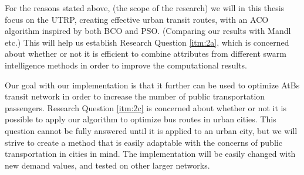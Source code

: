 For the reasons stated above, (the scope of the research) we will in this thesis focus on the UTRP, creating effective urban transit routes, with an ACO algorithm inspired by both BCO and PSO. (Comparing our results with Mandl etc.) This will help us establish Research Question \vref{itm:2a}, which is concerned about whether or not it is efficient to combine attributes from different swarm intelligence methods in order to improve the computational results.

Our goal with our implementation is that it further can be used to optimize AtBs transit network in order to increase the number of public transportation passengers. Research Question \vref{itm:2c} is concerned about whether or not it is possible to apply our algorithm to optimize bus routes in urban cities. This question cannot be fully answered until it is applied to an urban city, but we will strive to create a method that is easily adaptable with the concerns of public transportation in cities in mind. The implementation will be easily changed with new demand values, and tested on other larger networks.

